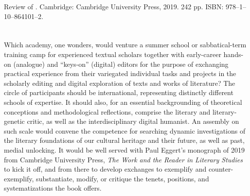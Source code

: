 


\begin{review}
\renewcommand*{\pagemark}{}


\begin{reviewed}
Review of \thecontribution. Cambridge: Cambridge University Press, 2019. 242 pp. ISBN: 978--1--10--864101--2.
\end{reviewed}


\section*{} 
Which academy, one wonders, would venture a summer school or
sabbatical-term training camp for experienced textual scholars together
with early-career hands-on (analogue) and ``keys-on'' (digital) editors
for the purpose of exchanging practical experience from their variegated
individual tasks and projects in the scholarly editing and digital
exploration of texts and works of literature? The circle of participants
should be international, representing distinctly different schools of
expertise. It should also, for an essential backgrounding of theoretical
conceptions and methodological reflections, comprise the literary and
literary-genetic critic, as well as the interdisciplinary digital
humanist. An assembly on such scale would convene the competence for
searching dynamic investigations of the literary foundations of our
cultural heritage and their future, as well as past, medial unlocking.
It would be well served with Paul Eggert's monograph of 2019 from
Cambridge University Press, \emph{The Work and the Reader in Literary
Studies} to kick it off, and from there to develop exchanges to
exemplify and counter-exemplify, substantiate, modify, or critique the
tenets, positions, and systematizations the book offers.


\end{review}

